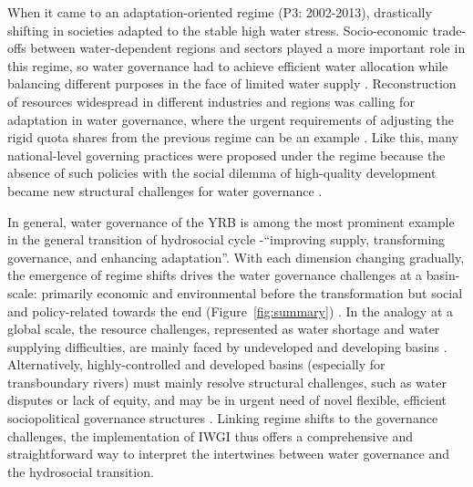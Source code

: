 When it came to an adaptation-oriented regime (P3: 2002-2013), drastically shifting in societies adapted to the stable high water stress.
Socio-economic trade-offs between water-dependent regions and sectors played a more important role in this regime, so water governance had to achieve efficient water allocation while balancing different purposes in the face of limited water supply
\cite{dalin2015,song2022}.
Reconstruction of resources widespread in different industries and regions was calling for adaptation in water governance, where the urgent requirements of adjusting the rigid quota shares from the previous regime can be an example \cite{wang2019a}.
Like this, many national-level governing practices were proposed under the regime because the absence of such policies with the social dilemma of high-quality development became new structural challenges for water governance
\cite{konar2019}.

In general, water governance of the YRB is among the most prominent example in the general transition of hydrosocial cycle -``improving supply, transforming governance, and enhancing adaptation''.
With each dimension changing gradually, the emergence of regime shifts drives the water governance challenges at a basin-scale: primarily economic and environmental before the transformation but social and policy-related towards the end (Figure~\ref{fig:summary}) \cite{singh2019,porcher2019}.
In the analogy at a global scale, the resource challenges, represented as water shortage and water supplying difficulties, are mainly faced by undeveloped and developing basins
\cite{allan2019,speed2013,liu2012a}.
Alternatively, highly-controlled and developed basins (especially for transboundary rivers) must mainly resolve structural challenges, such as water disputes or lack of equity, and may be in urgent need of novel flexible, efficient sociopolitical governance structures
\cite{unep-dhi2016,mirumachi2015}.
Linking regime shifts to the governance challenges, the implementation of IWGI thus offers a comprehensive and straightforward way to interpret the intertwines between water governance and the hydrosocial transition.

